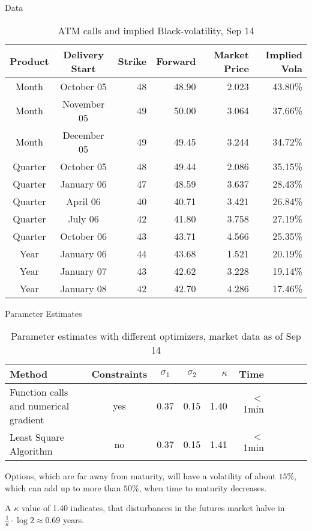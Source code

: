 {Data}
{\small \begin{table}[btp]
\begin{center}
\begin{tabular}{ccrrrr}
Product     & Delivery Start    & Strike    &   Forward & Market Price  &Implied Vola \\
\hline
Month   &October 05     &48 &48.90&2.023&43.80\%\\
Month   &November 05        &49 &50.00&3.064&37.66\%\\
Month   &December 05        &49 &49.45&3.244&34.72\%\\
\hline
Quarter & October 05        &48 &49.44&2.086&35.15\%\\
Quarter & January 06        &47 &48.59&3.637&28.43\%\\
Quarter & April 06          &40 &40.71&3.421&26.84\%\\
Quarter & July 06           &42 &41.80&3.758&27.19\%\\
Quarter & October 06        &43 &43.71&4.566&25.35\%\\
\hline
Year    &January 06     &44 &43.68&1.521&20.19\%\\
Year    &January 07     &43 &42.62&3.228&19.14\%\\
Year    &January 08     &42 &42.70&4.286&17.46\%\\
\end{tabular}
\caption{ATM calls and implied Black-volatility, Sep 14}
\label{fig:data}
\end{center}
\end{table}
}

{Parameter Estimates}
 \begin{table}[btp]
 \begin{center}
\begin{tabular}{p{4cm}cccrrrrcc}
Method  &Constraints    &$\sigma_1$ &$\sigma_2$ &$\kappa$   &Time&\\
\hline
Function calls and numerical gradient       &yes            &0.37       &0.15       &1.40       &$<$1min&\\
Least Square Algorithm  &no&0.37&0.15&1.41      &$<$1min&\\
\end{tabular}
\caption{Parameter estimates with different optimizers, market data as of Sep 14}
\label{fig:estimates18}
\end{center}
\end{table}

Options, which are far away from maturity, will have a volatility of about $15\%$,
which can add up to more than $50\%$, when time to maturity decreases.

A $\kappa$ value of 1.40 indicates, that disturbances in the futures market
halve in $\frac{1}{\kappa}\cdot \log 2 \approx 0.69$ years.
